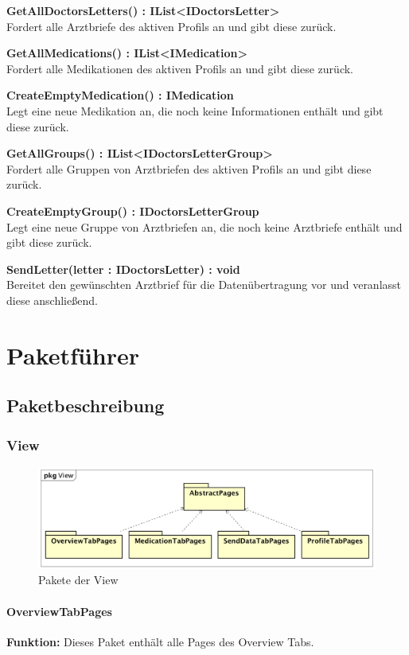 \documentclass[a4paper]{scrreprt}
\begin{document}
\textbf{GetAllDoctorsLetters() : IList<IDoctorsLetter>}\\
Fordert alle Arztbriefe des aktiven Profils an und gibt diese zurück.

\textbf{GetAllMedications() : IList<IMedication>}\\
Fordert alle Medikationen des aktiven Profils an und gibt diese zurück.

\textbf{CreateEmptyMedication() : IMedication}\\
Legt eine neue Medikation an, die noch keine Informationen enthält und gibt diese zurück.

\textbf{GetAllGroups() : IList<IDoctorsLetterGroup>}\\
Fordert alle Gruppen von Arztbriefen des aktiven Profils an und gibt diese zurück.

\textbf{CreateEmptyGroup() : IDoctorsLetterGroup}\\
Legt eine neue Gruppe von Arztbriefen an, die noch keine Arztbriefe enthält und gibt diese zurück.

\textbf{SendLetter(letter : IDoctorsLetter) : void}\\
Bereitet den gewünschten Arztbrief für die Datenübertragung vor und veranlasst diese anschließend.

\chapter{Paketführer}
\section{Paketbeschreibung}
\subsection{View}
\begin{figure}[H]
\centering
\includegraphics[width=0.75\textheight]{graphics/Klassendiagramme/View/ViewLayout.png}
\caption{Pakete der View}
\end{figure}
\subsubsection{OverviewTabPages}
\textbf{Funktion:} Dieses Paket enthält alle Pages des Overview Tabs.
\end{document}
